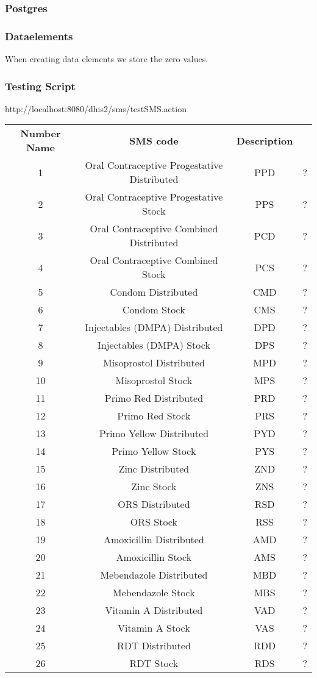 \subsubsection{Postgres}
\subsubsection{Dataelements}
When creating data elements we store the zero values.
\subsubsection{Testing Script}
http://localhost:8080/dhis2/sms/testSMS.action
\begin{tabular}{|c|c|c|c|}
\hline
\textbf{Number} \textbf{Name} & \textbf{SMS code} & \textbf{Description} \\
1 & Oral Contraceptive Progestative Distributed & PPD & ? \\
2 & Oral Contraceptive Progestative Stock & PPS & ? \\
3 & Oral Contraceptive Combined Distributed & PCD & ? \\
4 & Oral Contraceptive Combined Stock & PCS & ? \\
5 & Condom Distributed & CMD & ? \\
6 & Condom Stock & CMS & ? \\
7 & Injectables (DMPA) Distributed & DPD & ? \\
8 & Injectables (DMPA) Stock & DPS & ? \\
9 & Misoprostol Distributed & MPD & ? \\
10 & Misoprostol Stock & MPS & ? \\
11 & Primo Red Distributed & PRD & ? \\
12 & Primo Red Stock & PRS & ? \\
13 & Primo Yellow Distributed & PYD & ? \\
14 & Primo Yellow Stock & PYS & ? \\ 
15 & Zinc Distributed & ZND & ? \\
16 & Zinc Stock & ZNS & ? \\
17 & ORS Distributed & RSD & ? \\
18 & ORS Stock & RSS & ? \\
19 & Amoxicillin Distributed & AMD & ? \\
20 & Amoxicillin Stock & AMS & ? \\
21 & Mebendazole Distributed & MBD & ? \\
22 & Mebendazole Stock & MBS & ? \\
23 & Vitamin A Distributed & VAD & ? \\
24 & Vitamin A Stock & VAS & ? \\
25 & RDT Distributed & RDD & ? \\
26 & RDT Stock & RDS & ? \\
\hline
\end{tabular}

